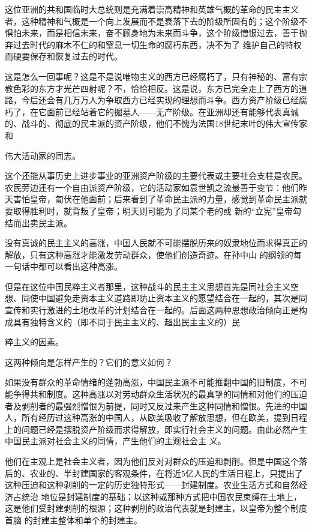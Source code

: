 \documentclass{article}
\begin{document}
这位亚洲的共和国临时大总统则是充满着崇高精神和英雄气概的革命的民主主义者，这种精神和气概是一个向上发展而不是衰落下去的阶级所固有的；这个阶级不惧怕未来，而是相信未来，奋不顾身地为未来而斗争，这个阶级憎恨过去，善于抛弃过去时代的麻木不仁的和窒息一切生命的腐朽东西，决不为了
维护自己的特权而硬要保存和恢复过去的时代。 

这是怎么一回事呢？这是不是说唯物主义的西方已经腐朽了，只有神秘的、富有宗教色彩的东方才光芒四射呢？不，恰恰相反。这是说，东方已完全走上了西方的道路，今后还会有几万万人为争取西方已经实现的理想而斗争。西方资产阶级已经腐朽了，在它面前已经站着它的掘墓人——无产阶级。在亚洲却还有能够代表真诚的、战斗的、彻底的民主派的资产阶级，他们不愧为法国18世纪末叶的伟大宣传家和
\newpage

伟大活动家的同志。 

这个还能从事历史上进步事业的亚洲资产阶级的主要代表或主要社会支柱是农民。农民旁边还有一个自由派资产阶级，它的活动家如袁世凯之流最善于变节：他们昨天害怕皇帝，匍伏在他面前；后来看到了革命民主派的力量，感觉到革命民主派就要取得胜利时，就背叛了皇帝；明天则可能为了同某个老的或
新的“立宪”皇帝勾结而出卖民主派。 

没有真诚的民主主义的高涨，中国人民就不可能摆脱历来的奴隶地位而求得真正的解放，只有这种高涨才能激发劳动群众，使他们创造奇迹。在孙中山
的纲领的每一句话中都可以看出这种高涨。 

但是在这位中国民粹主义者那里，这种战斗的民主主义思想首先是同社会主义空想、同使中国避免走资本主义道路即防止资本主义的愿望结合在一起的，其次是同宣传和实行激进的土地改革的计划结合在一起的。后面这两种思想政治倾向正是构成具有独特含义的（即不同于民主主义的、超出民主主义的）民
\newpage

粹主义的因素。 

这两种倾向是怎样产生的？它们的意义如何？
 

如果没有群众的革命情绪的蓬勃高涨，中国民主派不可能推翻中国的旧制度，不可能争得共和制度。这种高涨以对劳动群众生活状况的最真挚的同情和对他们的压迫者及剥削者的最强烈憎恨为前提，同时又反过来产生这种同情和憎恨。先进的中国人，所有经历过这种高涨的中国人，从欧美吸收了解放思想，但在欧美，提到日程上的问题已经是摆脱资产阶级而求得解放，即实行社会主义的问题。由此必然产生中国民主派对社会主义的同情，产生他们的主观社会主
义。 

他们在主观上是社会主义者，因为他们反对对群众的压迫和剥削。但是中国这个落后的、农业的、半封建国家的客观条件，在将近5亿人民的生活日程上，只提出了这种压迫和这种剥削的一定的历史独特形式——封建制度。农业生活方式和自然经济占统治
\newpage
地位是封建制度的基础；以这种或那种方式把中国农民束缚在土地上，这是他们受封建剥削的根源；这种剥削的政治代表就是封建主，以皇帝为整个制度首脑
的封建主整体和单个的封建主。 
\end{document}
